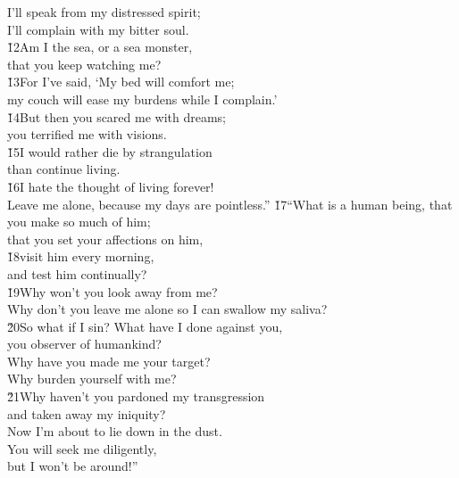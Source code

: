 \begin{poetry}
\poemll    I'll speak from my distressed spirit; \\
\poemlll       I'll complain with my bitter soul. \\
\poeml \v{12}Am I the sea, or a sea monster, \\
\poemll    that you keep watching me? \\
\poeml \v{13}For I've said, `My bed will comfort me; \\
\poemll    my couch will ease my burdens while I complain.' \\
\poeml \v{14}But then you scared me with dreams; \\
\poemll    you terrified me with visions. \\
\poeml \v{15}I would rather die by strangulation \\
\poemll    than continue living. \\
\poeml \v{16}I hate the thought of living forever! \\
\poemll    Leave me alone, because my days are pointless.''
\poeml \v{17}``What is a human being, that you make so much of him; \\
\poemll    that you set your affections on him, \\
\poeml \v{18}visit him every morning, \\
\poemll    and test him continually? \\
\poeml \v{19}Why won't you look away from me? \\
\poemll    Why don't you leave me alone so I can swallow my saliva? \\
\poeml \v{20}So what if I sin? What have I done against you, \\
\poemll    you observer of humankind? \\
\poeml Why have you made me your target? \\
\poemll    Why burden yourself with me? \\
\poeml \v{21}Why haven't you pardoned my transgression \\
\poemll    and taken away my iniquity? \\
\poeml Now I'm about to lie down in the dust. \\
\poemll    You will seek me diligently, \\
\poemlll       but I won't be around!''
\end{poetry}

